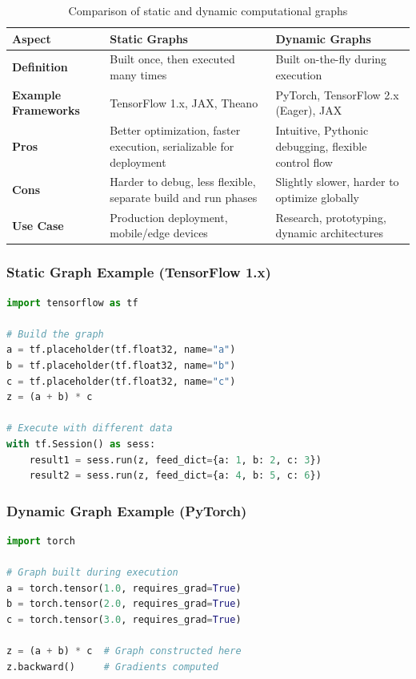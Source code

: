 \documentclass[11pt]{article}
\begin{document}
\begin{table}[h]
\centering
\begin{tabular}{|p{3cm}|p{5cm}|p{5cm}|}
\hline
\textbf{Aspect} & \textbf{Static Graphs} & \textbf{Dynamic Graphs} \\
\hline
\textbf{Definition} & Built once, then executed many times & Built on-the-fly during execution \\
\hline
\textbf{Example Frameworks} & TensorFlow 1.x, JAX, Theano & PyTorch, TensorFlow 2.x (Eager), JAX \\
\hline
\textbf{Pros} & Better optimization, faster execution, serializable for deployment & Intuitive, Pythonic debugging, flexible control flow \\
\hline
\textbf{Cons} & Harder to debug, less flexible, separate build and run phases & Slightly slower, harder to optimize globally \\
\hline
\textbf{Use Case} & Production deployment, mobile/edge devices & Research, prototyping, dynamic architectures \\
\hline
\end{tabular}
\caption{Comparison of static and dynamic computational graphs}
\end{table}

\subsubsection{Static Graph Example (TensorFlow 1.x)}

\begin{lstlisting}[language=Python, caption=Static graph construction]
import tensorflow as tf

# Build the graph
a = tf.placeholder(tf.float32, name="a")
b = tf.placeholder(tf.float32, name="b")
c = tf.placeholder(tf.float32, name="c")
z = (a + b) * c

# Execute with different data
with tf.Session() as sess:
    result1 = sess.run(z, feed_dict={a: 1, b: 2, c: 3})
    result2 = sess.run(z, feed_dict={a: 4, b: 5, c: 6})
\end{lstlisting}

\subsubsection{Dynamic Graph Example (PyTorch)}

\begin{lstlisting}[language=Python, caption=Dynamic graph construction]
import torch

# Graph built during execution
a = torch.tensor(1.0, requires_grad=True)
b = torch.tensor(2.0, requires_grad=True)
c = torch.tensor(3.0, requires_grad=True)

z = (a + b) * c  # Graph constructed here
z.backward()     # Gradients computed
\end{lstlisting}
\end{document}
